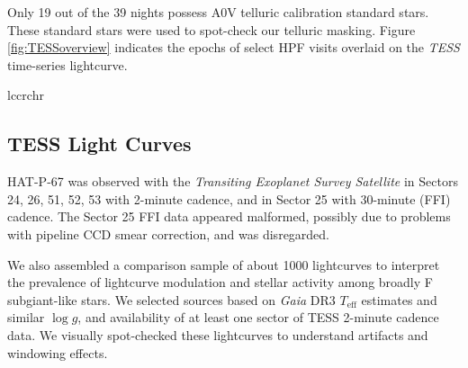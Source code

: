 \documentclass[twocolumn]{aastex631}
\begin{document}
Only 19 out of the 39 nights possess A0V telluric calibration standard stars.  These standard stars were used to spot-check our telluric masking.  Figure \ref{fig:TESSoverview} indicates the epochs of select HPF visits overlaid on the \emph{TESS} time-series lightcurve.


\begin{deluxetable}{lccrchr}
    \tablewidth{0pc}
    \tabletypesize{\scriptsize}
    \startdata
    
    \enddata
\end{deluxetable}

\subsection{TESS Light Curves}
HAT-P-67 was observed with the \emph{Transiting Exoplanet Survey Satellite} \citep[TESS,][]{2014SPIE.9143E..20R} in Sectors 24, 26, 51, 52, 53 with 2-minute cadence, and in Sector 25 with 30-minute (FFI) cadence.  The Sector 25 FFI data appeared malformed, possibly due to problems with pipeline CCD smear correction, and was disregarded.

We also assembled a comparison sample of about 1000 lightcurves to interpret the prevalence of lightcurve modulation and stellar activity among broadly F subgiant-like stars.  We selected sources based on \emph{Gaia} DR3 $T_\mathrm{eff}$ estimates and similar $\log{g}$,  and availability of at least one sector of TESS 2-minute cadence data.  We visually spot-checked these lightcurves to understand artifacts and windowing effects.
\end{document}

